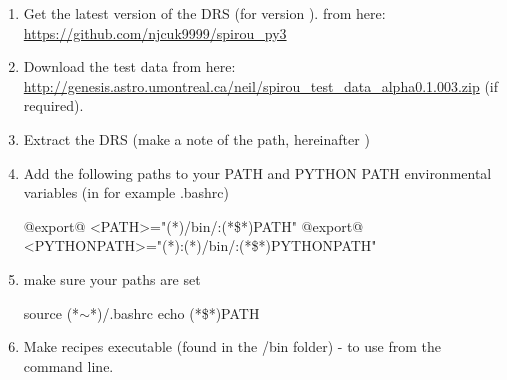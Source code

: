 \begin{enumerate}

\item Get the latest version of the DRS (for \instrument version \MyCodeVersion). from here: \url{https://github.com/njcuk9999/spirou_py3}

\item Download the test data from here: \url{http://genesis.astro.umontreal.ca/neil/spirou_test_data_alpha0.1.003.zip} (if required).

\item Extract the DRS (make a note of the path, hereinafter \InstallDIR)

\item Add the following paths to your PATH and PYTHON PATH environmental variables (in for example .bashrc)

	\begin{bashbox}[title={e.g. in $\sim$/.bashrc}]
	@export@ <PATH>="(*\InstallDIR*)/bin/:{(*\$*)PATH}"
	@export@ <PYTHONPATH>="(*\InstallDIR*):(*\InstallDIR*)/bin/:{(*\$*)PYTHONPATH}"
	\end{bashbox}

\item make sure your paths are set
	\begin{cmdbox}
	source (*$\sim$*)/.bashrc
	echo (*\$*)PATH
	\end{cmdbox}

\item Make recipes executable (found in the \InstallDIR/bin folder) - to use from the command line.


\end{enumerate}
